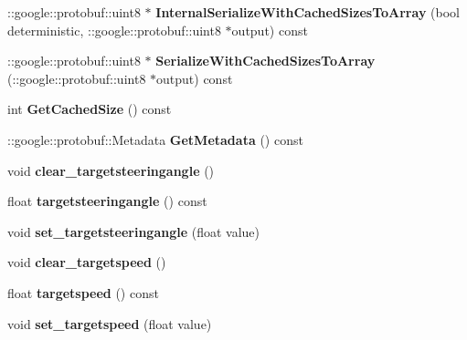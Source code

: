 \begin{DoxyCompactItemize}
\item 
\mbox{\label{classcontrol_data_1_1_control_c_m_d_a7f1adbc9bc565cf6c9ee6c05e9bacd45}} 
\+::google\+::protobuf\+::uint8 $\ast$ {\bfseries Internal\+Serialize\+With\+Cached\+Sizes\+To\+Array} (bool deterministic, \+::google\+::protobuf\+::uint8 $\ast$output) const
\item 
\mbox{\label{classcontrol_data_1_1_control_c_m_d_adc2d466b1136f06aa04dc458812a7ac9}} 
\+::google\+::protobuf\+::uint8 $\ast$ {\bfseries Serialize\+With\+Cached\+Sizes\+To\+Array} (\+::google\+::protobuf\+::uint8 $\ast$output) const
\item 
\mbox{\label{classcontrol_data_1_1_control_c_m_d_ae92b91d1fe850afcd18a366446def2a5}} 
int {\bfseries Get\+Cached\+Size} () const
\item 
\mbox{\label{classcontrol_data_1_1_control_c_m_d_a1c91b2f6dda8afdcaaac804678c23c2d}} 
\+::google\+::protobuf\+::\+Metadata {\bfseries Get\+Metadata} () const
\item 
\mbox{\label{classcontrol_data_1_1_control_c_m_d_ad749a00d73bb5165b132de75e1d5cffa}} 
void {\bfseries clear\+\_\+targetsteeringangle} ()
\item 
\mbox{\label{classcontrol_data_1_1_control_c_m_d_a580fba5298f6e9d35ce61c962bbd94af}} 
float {\bfseries targetsteeringangle} () const
\item 
\mbox{\label{classcontrol_data_1_1_control_c_m_d_a805bcf11d9bd1f1ff7fe62c03830a05b}} 
void {\bfseries set\+\_\+targetsteeringangle} (float value)
\item 
\mbox{\label{classcontrol_data_1_1_control_c_m_d_a1a6472341505f92253498f2470f2ea6c}} 
void {\bfseries clear\+\_\+targetspeed} ()
\item 
\mbox{\label{classcontrol_data_1_1_control_c_m_d_a8cb220730d7c814fcb67e1759b553d22}} 
float {\bfseries targetspeed} () const
\item 
\mbox{\label{classcontrol_data_1_1_control_c_m_d_a265ad4857ceac6d030f987a36159aed0}} 
void {\bfseries set\+\_\+targetspeed} (float value)
\end{DoxyCompactItemize}
